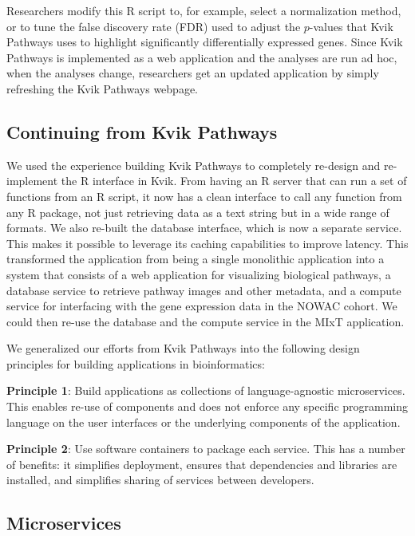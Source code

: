 Researchers modify this R script to, for example, select a normalization method,
or to tune the false discovery rate (FDR) used to adjust the $p$-values that
Kvik Pathways uses to highlight significantly differentially expressed genes.
Since Kvik Pathways is implemented as a web application and the analyses are run
ad hoc, when the analyses change, researchers get an updated application by
simply refreshing the Kvik Pathways webpage. 

\subsection{Continuing from Kvik Pathways}

We used the experience building Kvik Pathways to completely re-design and
re-implement the R interface in Kvik. From having an R server that can run a
set of functions from an R script, it now has a clean interface to call any
function from any R package, not just retrieving data as a text string but in a
wide range of formats. We also re-built the database interface, which is now a
separate service. This makes it possible to leverage its caching capabilities
to improve latency. This transformed the application from being a single
monolithic application into a system that consists of a web application for
visualizing biological pathways, a database service to retrieve pathway images
and other metadata, and a compute service for interfacing with the gene
expression data in the NOWAC cohort. We could then re-use the database and the
compute service in the MIxT application. 

We generalized our efforts from Kvik Pathways into the following design
principles for building applications in bioinformatics: 

\textbf{Principle 1}: Build applications as collections of language-agnostic
microservices. This enables re-use of components and does not enforce any
specific programming language on the user interfaces or the underlying
components of the application. 

\textbf{Principle 2}: Use software containers to package each service. This has
a number of benefits: it simplifies deployment, ensures that dependencies and
libraries are installed, and  simplifies sharing of services between
developers. 

\subsection{Microservices}\label{micrservices} 
